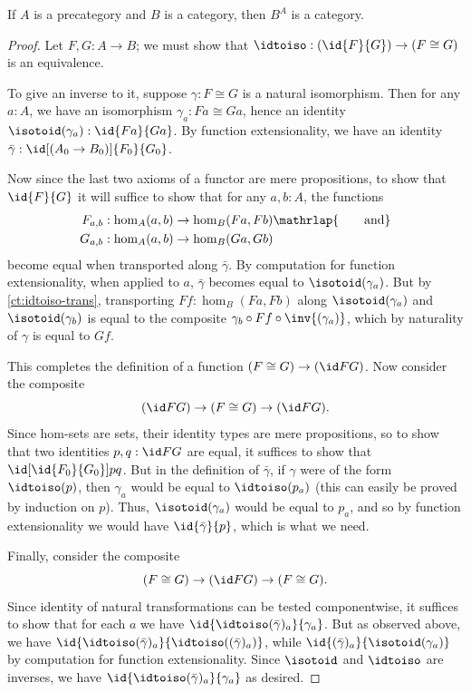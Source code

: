 %
\begin{thm}\label{ct:functor-cat}
  If $A$ is a precategory and $B$ is a category, then $B^A$ is a category.
\end{thm}

\begin{proof}
  Let $F,G:A\to B$; we must show that $\idtoiso:(\id{F}{G}) \to (F\cong G)$ is an equivalence.

  To give an inverse to it, suppose $\gamma:F\cong G$ is a natural isomorphism.
  Then for any $a:A$, we have an isomorphism $\gamma_a:Fa \cong Ga$, hence an identity $\isotoid(\gamma_a):\id{Fa}{Ga}$.
  By function extensionality, we have an identity $\bar{\gamma}:\id[(A_0\to B_0)]{F_0}{G_0}$.

  Now since the last two axioms of a functor are mere propositions, to show that $\id{F}{G}$ it will suffice to show that for any $a,b:A$, the functions
  \begin{align*}
    F_{a,b}&:\hom_A(a,b) \to \hom_B(Fa,Fb)\mathrlap{\qquad\text{and}}\\
    G_{a,b}&:\hom_A(a,b) \to \hom_B(Ga,Gb)
  \end{align*}
  become equal when transported along $\bar\gamma$.
  By computation for function extensionality, when applied to $a$, $\bar\gamma$ becomes equal to $\isotoid(\gamma_a)$.
  But by \cref{ct:idtoiso-trans}, transporting $Ff:\hom_B(Fa,Fb)$ along $\isotoid(\gamma_a)$ and $\isotoid(\gamma_b)$ is equal to the composite $\gamma_b\circ Ff\circ \inv{(\gamma_a)}$, which by naturality of $\gamma$ is equal to $Gf$.

  This completes the definition of a function $(F\cong G) \to (\id F G)$.
  Now consider the composite
  \[ (\id F G) \to (F\cong G) \to (\id F G). \]
  Since hom-sets are sets, their identity types are mere propositions, so to show that two identities $p,q:\id F G$ are equal, it suffices to show that $\id[\id{F_0}{G_0}]{p}{q}$.
  But in the definition of $\bar\gamma$, if $\gamma$ were of the form $\idtoiso(p)$, then $\gamma_a$ would be equal to $\idtoiso(p_a)$ (this can easily be proved by induction on $p$).
  Thus, $\isotoid(\gamma_a)$ would be equal to $p_a$, and so by function extensionality we would have $\id{\bar\gamma}{p}$, which is what we need.

  Finally, consider the composite
  \[(F\cong G)\to  (\id F G) \to (F\cong G). \]
  Since identity of natural transformations can be tested componentwise, it suffices to show that for each $a$ we have $\id{\idtoiso(\bar\gamma)_a}{\gamma_a}$.
  But as observed above, we have $\id{\idtoiso(\bar\gamma)_a}{\idtoiso((\bar\gamma)_a)}$, while $\id{(\bar\gamma)_a}{\isotoid(\gamma_a)}$ by computation for function extensionality.
  Since $\isotoid$ and $\idtoiso$ are inverses, we have $\id{\idtoiso(\bar\gamma)_a}{\gamma_a}$ as desired.
\end{proof}
